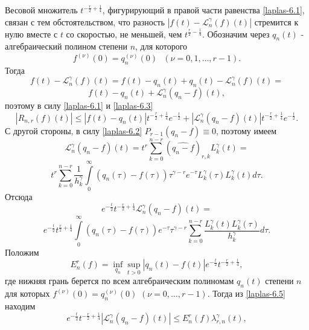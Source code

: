 Весовой множитель $t^{-\frac r2+\frac14}$, фигурирующий в правой части равенства \eqref{laplas-6.1}, связан с тем обстоятельством, что разность
$|f(t)-\mathcal{L}_n^\gamma(f)(t)|$ стремится к нулю вместе с $t$ со скоростью, не меньшей, чем  $t^{\frac r2-\frac14}$.
Обозначим через $q_n(t)$ - алгебраический полином степени $n$, для которого
\begin{equation}\label{laplas-6.2}
  f^{(\nu)}(0)=q_n^{(\nu)}(0)\text{ }(\nu=0,1,\ldots,r-1).
\end{equation}
Тогда
\begin{equation*}
  f(t)-\mathcal{L}_n^\gamma(f)(t)=f(t)-q_n(t)+q_n(t)-\mathcal{L}_n^\gamma(f)(t)=
\end{equation*}
\begin{equation}\label{laplas-6.3}
  f(t)-q_n(t)+\mathcal{L}_n^\gamma(q_n-f)(t),
\end{equation}
поэтому в силу \eqref{laplas-6.1} и \eqref{laplas-6.3}
\begin{equation}\label{laplas-6.4}
  |R_{n,r}(f)(t)|\le|f(t)-q_n(t)|t^{-\frac r2+\frac14}e^{-\frac t2}+|\mathcal{L}_n^\gamma(q_n-f)(t)|t^{-\frac r2+\frac14}e^{-\frac t2}.
\end{equation}
С другой стороны, в силу \eqref{laplas-6.2} $P_{r-1}(q_n-f)\equiv0$, поэтому  имеем
\begin{equation*}
  \mathcal{L}_n^\gamma(q_n-f)(t)=t^r\sum\limits_{k=0}^{n-r}(\widehat{q_n-f})_{r,k}L_k^\gamma(t)=
\end{equation*}
\begin{equation*}
  t^r\sum\limits_{k=0}^{n-r}\frac1{h_k^\gamma}\int\limits_0^\infty(q_n(\tau)-f(\tau))\tau^{\gamma-r}e^{-\tau}L_k^\gamma(\tau)L_k^\gamma(t)d\tau.
\end{equation*}
Отсюда
$$
e^{-\frac t2}t^{-\frac r2+\frac14}\mathcal{L}_n^\gamma(q_n-f)(t)=
$$
\begin{equation}\label{laplas-6.5}
  e^{-\frac t2}t^{\frac r2+\frac14}\int\limits_0^\infty(q_n(\tau)-f(\tau))e^{-\tau}\tau^{\gamma-r}\sum\limits_{k=0}^{n-r}\frac{L_k^\gamma(t)L_k^\gamma(\tau)}{h_k^\gamma}d\tau.
\end{equation}
Положим
\begin{equation}\label{laplas-6.6}
  E_n^r(f)=\inf\limits_{q_n}\sup\limits_{t>0}|q_n(t)-f(t)|e^{-\frac t2}t^{-\frac r2+\frac14},
\end{equation}
где нижняя грань берется по всем алгебраическим полиномам $q_n(t)$ степени $n$ для которых $f^{(\nu)}(0)=q_n^{(\nu)}(0)$ $(\nu=0,\ldots,r-1)$. Тогда из \eqref{laplas-6.5} находим
\begin{equation}\label{laplas-6.7}
 e^{-\frac{t}{2}} t^{-\frac r2+\frac14}|\mathcal{L}_n^\gamma(q_n-f)(t)|\le E_n^r(f)\lambda_{r,n}^\gamma(t),
\end{equation}
